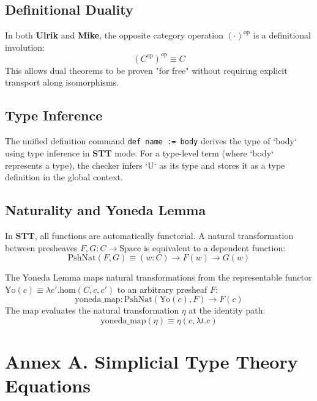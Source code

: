 \documentclass[11pt]{article}
\newcommand{\mike}[0]{\textbf{Mike}}
\newcommand{\ulrik}[0]{\textbf{Ulrik}}
\newcommand{\stt}[0]{\textbf{STT}}
\newcommand{\op}[0]{^\text{op}}
\newcommand{\homtype}[3]{\text{hom}(#1, #2, #3)}
\begin{document}
\subsection{Definitional Duality}

In both \ulrik{} and \mike{}, the opposite category operation $(\cdot)\op$ is a definitional involution:
\begin{equation}
    (C\op)\op \equiv C
\end{equation}
This allows dual theorems to be proven "for free" without requiring explicit transport along isomorphisms.

\subsection{Type Inference}

The unified definition command \texttt{def name := body} derives the type of `body` using type inference in \stt{} mode. For a type-level term (where `body` represents a type), the checker infers `U` as its type and stores it as a type definition in the global context.

\subsection{Naturality and Yoneda Lemma}

In \stt{}, all functions are automatically functorial. A natural transformation between presheaves $F, G : C \to \text{Space}$ is equivalent to a dependent function:
\begin{equation}
    \text{PshNat}(F, G) \equiv (w : C) \to F(w) \to G(w)
\end{equation}

The Yoneda Lemma maps natural transformations from the representable functor $\text{Yo}(c) \equiv \lambda c'. \homtype{C}{c}{c'}$ to an arbitrary presheaf $F$:
\begin{equation}
    \text{yoneda\_map} : \text{PshNat}(\text{Yo}(c), F) \to F(c)
\end{equation}
The map evaluates the natural transformation $\eta$ at the identity path:
\begin{equation}
    \text{yoneda\_map}(\eta) \equiv \eta(c, \lambda t. c)
\end{equation}

\newpage
\section{Annex A. Simplicial Type Theory Equations}
\end{document}
